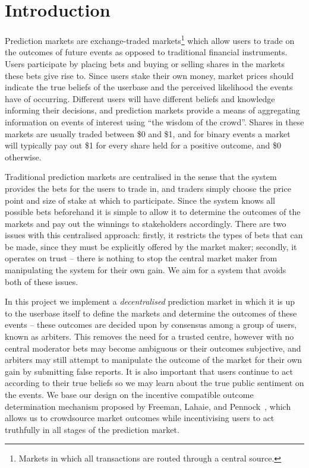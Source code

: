 \section{Introduction}

\label{sec:introduction}

Prediction markets are exchange-traded markets\footnote{Markets in which all
transactions are routed through a central source.} which allow users to trade
on the outcomes of future events as opposed to traditional financial
instruments. Users participate by placing bets and buying or selling shares in
the markets these bets give rise to. Since users stake their own money, market
prices should indicate the true beliefs of the userbase and the perceived
likelihood the events have of occurring. Different users will have different
beliefs and knowledge informing their decisions, and prediction markets provide
a means of aggregating information on events of interest using ``the wisdom of
the crowd''. Shares in these markets are usually traded between \$0 and \$1,
and for binary events a market will typically pay out \$1 for every share held
for a positive outcome, and \$0 otherwise.

Traditional prediction markets are centralised in the sense that the system
provides the bets for the users to trade in, and traders simply choose the
price point and size of stake at which to participate. Since the system knows
all possible bets beforehand it is simple to allow it to determine the outcomes
of the markets and pay out the winnings to stakeholders accordingly. There are
two issues with this centralised approach: firstly, it restricts the types of
bets that can be made, since they must be explicitly offered by the market
maker; secondly, it operates on trust -- there is nothing to stop the central
market maker from manipulating the system for their own gain. We aim for a
system that avoids both of these issues.

In this project we implement a \emph{decentralised} prediction market in which
it is up to the userbase itself to define the markets and determine the
outcomes of these events -- these outcomes are decided upon by consensus among
a group of users, known as arbiters. This removes the need for a trusted
centre, however with no central moderator bets may become ambiguous or their
outcomes subjective, and arbiters may still attempt to manipulate the outcome
of the market for their own gain by submitting false reports. It is also
important that users continue to act according to their true beliefs so we may
learn about the true public sentiment on the events. We base our design on the
incentive compatible outcome determination mechanism proposed by Freeman,
Lahaie, and Pennock~\cite{CODiPM}, which allows us to crowdsource market
outcomes while incentivising users to act truthfully in all stages of the
prediction market.

